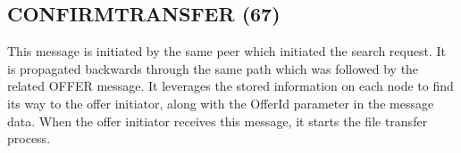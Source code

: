 \begin{figure}[H]
    \centering
\end{figure}

\subsection{CONFIRMTRANSFER (67)}

This message is initiated by the same peer which initiated the search request. 
It is propagated backwards through the same path which was followed by the 
related OFFER message. It leverages the stored information on each node to find 
its way to the offer initiator, along with the OfferId parameter in the message 
data. When the offer initiator receives this message, it starts the file 
transfer process.

\begin{figure}[H]
    \centering
\end{figure}
